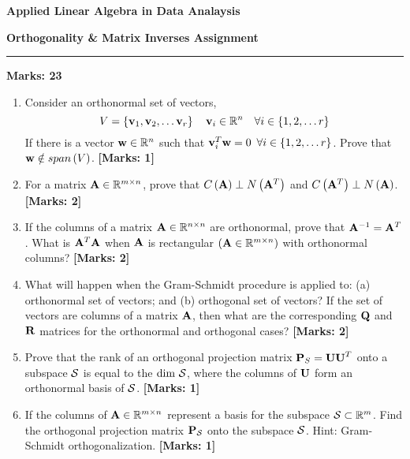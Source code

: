 \documentclass[12pt]{article}
\def\mf{\ensuremath\mathbf}
\def\mb{\ensuremath\mathbb}
\def\mc{\ensuremath\mathcal}
\def\lp{\ensuremath\left(}
\def\rp{\ensuremath\right)}
\begin{document}
\begin{center}
\begin{large}
\textbf{Applied Linear Algebra in Data Analaysis}\\
\vspace{0.1cm}
\end{large}
\textbf{Orthogonality \& Matrix Inverses Assignment}
\end{center}
\hrule
\vspace{1em}

\begin{large}
    \textbf{Marks: 23}
\end{large}

\begin{enumerate}
  \item Consider an orthonormal set of vectors,
  \[ V = \left\{ \mf{v}_1, \mf{v}_2, \ldots \mf{v}_r\right\} \quad \mf{v}_i \in \mb{R}^n \quad \forall i \in \left\{1, 2, \ldots r\right\}\]
  If there is a vector $\mf{w} \in \mb{R}^n$ such that $\mf{v}_i^T\mf{w} = 0\,\,\,\forall i \in \left\{1, 2, \ldots r\right\}$. Prove that $\mf{w} \notin span\left(V\right)$. \textbf{[Marks: 1]}

  \item For a matrix $\mf{A} \in \mb{R}^{m \times n}$, prove that $C\lp\mf{A}\rp \perp N\lp\mf{A}^T\rp$ and $C\lp\mf{A}^T\rp \perp N\lp\mf{A}\rp$. \textbf{[Marks: 2]}

  \item If the columns of a matrix $\mf{A} \in \mb{R}^{n \times n}$ are orthonormal, prove that $\mf{A}^{-1} = \mf{A}^T$. What is $\mf{A}^T\mf{A}$ when $\mf{A}$ is rectangular $\left(\mf{A} \in \mb{R}^{m \times n}\right)$ with orthonormal columns? \textbf{[Marks: 2]}

  \item What will happen when the Gram-Schmidt procedure is applied to: (a) orthonormal set of vectors; and (b) orthogonal set of vectors? If the set of vectors are columns of a matrix $\mf{A}$, then what are the corresponding $\mf{Q}$ and $\mf{R}$ matrices for the orthonormal and orthogonal cases? \textbf{[Marks: 2]}

  \item Prove that the rank of an orthogonal projection matrix $\mf{P}_{S} = \mf{UU}^T$ onto a subspace $\mc{S}$ is equal to the $\text{dim } \mc{S}$, where the columns of $\mf{U}$ form an orthonormal basis of $\mc{S}$. \textbf{[Marks: 1]}

  \item If the columns of $\mf{A} \in \mb{R}^{m \times n}$ represent a basis for the subspace $\mc{S} \subset \mb{R}^m$. Find the orthogonal projection matrix $\mf{P}_\mc{S}$ onto the subspace $\mc{S}$. Hint: Gram-Schmidt orthogonalization. \textbf{[Marks: 1]}


\end{enumerate}
\end{document}
